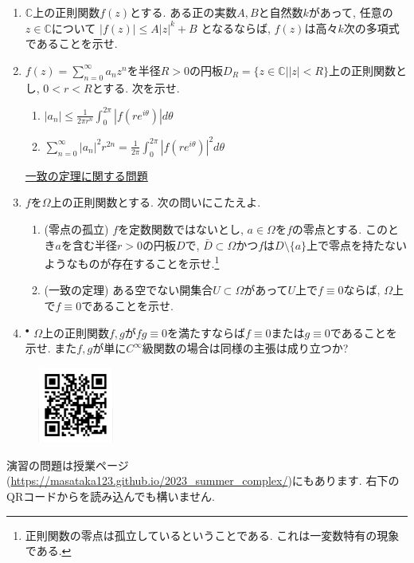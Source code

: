 \documentclass[dvipdfmx,a4paper,11pt]{article}
\newcommand{\N}{\mathbb{N}}
\newcommand{\C}{\mathbb{C}}
\theoremstyle{definition}
\begin{document}
\begin{enumerate}[label=\textbf{問}3.\arabic*]
  \item $\C$上の正則関数$f(z)$とする. ある正の実数$A,B$と自然数$k$があって, 任意の$z \in \C$について
  $
  |f(z)| \le A|z|^k +B
  $
  となるならば, $f(z)$は高々$k$次の多項式であることを示せ.
  


\item $f(z) = \sum_{n=0}^{\infty} a_n z^n$を半径$R>0$の円板$D_{R} = \{ z \in \C | |z|<R\}$上の正則関数とし, $0< r < R$とする. 次を示せ.
 \begin{enumerate}
\setlength{\parskip}{0cm} 
  \setlength{\itemsep}{0cm} 
  \item $|a_n| \le \frac{1}{2 \pi r^n} \int_{0}^{2 \pi} |f(r e^{i \theta})| d \theta$
  \item  $\sum_{n=0}^{\infty} |a_n|^2 r^{2n} =\frac{1}{2 \pi} \int_{0}^{2 \pi} |f(r e^{i \theta})|^2 d \theta$
  \end{enumerate}
  
\newpage 
  
   \vspace{12pt}
\hspace{-36pt}\underline{一致の定理に関する問題} 
  
    \item $f$を$\Omega$上の正則関数とする.  次の問いにこたえよ.
     \begin{enumerate}
\setlength{\parskip}{0cm} 
  \setlength{\itemsep}{0cm} 
   \item (零点の孤立) $f$を定数関数ではないとし, $a \in \Omega$を$f$の零点とする. 
   このとき$a$を含む半径$r > 0$の円板$D$で, $\bar{D} \subset \Omega$かつ$f$は$D \setminus \{ a\}$上で零点を持たないようなものが存在することを示せ.\footnote{正則関数の零点は孤立しているということである. これは一変数特有の現象である. }
     \item (一致の定理) ある空でない開集合$U \subset \Omega$があって$U$上で$f \equiv 0$ならば, $\Omega$上で$f \equiv0$であることを示せ. 
     
   \end{enumerate}
   \item $^{\bullet}$ $\Omega$上の正則関数$f,g$が$fg \equiv 0$を満たすならば$f \equiv 0$または$g \equiv 0$であることを示せ. また$f,g$が単に$C^{\infty}$級関数の場合は同様の主張は成り立つか?
   
 \end{enumerate}
 


 
 \vspace{11pt}\begin{figure}  \centering\includegraphics[height=25mm, width=25mm]{complex.png}\end{figure}

演習の問題は授業ページ(\url{https://masataka123.github.io/2023_summer_complex/})にもあります. 右下のQRコードからを読み込んでも構いません.


  
  
 
\end{document}
